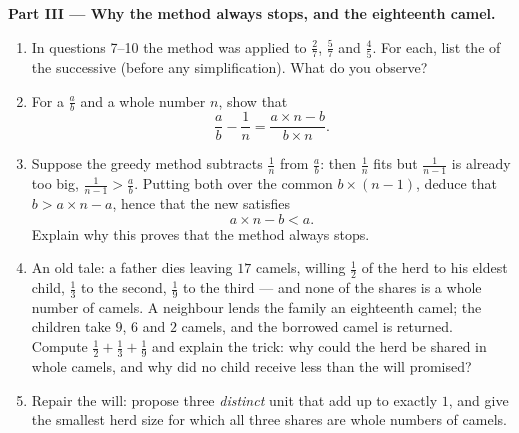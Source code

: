 \begin{problem}
\medskip
\noindent\textbf{Part III --- Why the method always stops, and the
eighteenth camel.}
\begin{enumerate}[resume]
  \item In questions 7--10 the method was applied to $\frac27$,
        $\frac57$ and $\frac45$. For each, list the  of
        the successive  (before any simplification).
        What do you observe?
  \item For a  $\frac ab$ and a whole number $n$, show
        that
        \[
        \frac{a}{b} - \frac{1}{n}
        = \frac{a \times n - b}{b \times n} .
        \]
  \item Suppose the greedy method subtracts $\frac1n$ from
        $\frac ab$: then $\frac1n$ fits but $\frac{1}{n-1}$ is
        already too big, $\frac{1}{n-1} > \frac ab$. Putting both
        over the common  $b \times (n - 1)$, deduce
        that $b > a \times n - a$, hence that the new 
        satisfies
        \[
        a \times n - b < a .
        \]
        Explain why this proves that the method always stops.
  \item An old tale: a father dies leaving $17$ camels, willing
        $\frac12$ of the herd to his eldest child, $\frac13$ to
        the second, $\frac19$ to the third --- and none of the
        shares is a whole number of camels. A neighbour lends the
        family an eighteenth camel; the children take $9$, $6$ and
        $2$ camels, and the borrowed camel is returned. Compute
        $\frac12 + \frac13 + \frac19$ and explain the trick: why
        could the herd be shared in whole camels, and why did no
        child receive less than the will promised?
  \item Repair the will: propose three \emph{distinct} unit
         that add up to exactly $1$, and give the
        smallest herd size for which all three shares are whole
        numbers of camels.
\end{enumerate}
\end{problem}
